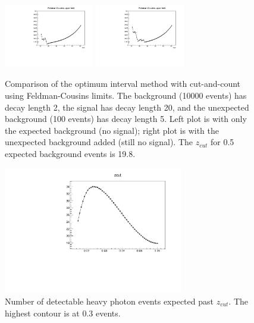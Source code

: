 \begin{figure}[ht]
\begin{center}
    \includegraphics[width=0.35\textwidth,page=4,angle=-90]{vertexing/figs/toy_nothing}
    \includegraphics[width=0.35\textwidth,page=4,angle=-90]{vertexing/figs/toy_nosignal}
\end{center}
    \caption{Comparison of the optimum interval method with cut-and-count using Feldman-Cousins limits. The background (10000 events) has decay length 2, the signal has decay length 20, and the unexpected background (100 events) has decay length 5. Left plot is with only the expected background (no signal); right plot is with the unexpected background added (still no signal). The $z_{cut}$ for 0.5 expected background events is 19.8.}
    \label{fig:optimum_interval_demo}
\end{figure}


\begin{figure}[ht]
\begin{center}
    \includegraphics[width=0.7\textwidth,page=5,angle=-90]{vertexing/figs/golden_mres_output}
\end{center}
    \caption{Number of detectable heavy photon events expected past $z_{cut}$. The highest contour is at 0.3 events.}
    \label{fig:detectable}
\end{figure}

